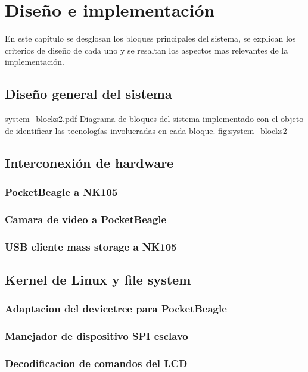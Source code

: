 \chapter{Diseño e implementación} %

\label{Chapter3}

En este capítulo se desglosan los bloques principales del sistema, se explican los criterios de diseño de cada uno y se resaltan los aspectos mas relevantes de la implementación.

\section{Diseño general del sistema}
         {system_blocks2.pdf}
         {Diagrama de bloques del sistema implementado con el objeto de identificar las tecnologías involucradas en cada bloque.}
         {fig:system_blocks2}
   
\section{Interconexión de hardware}
   \subsection{PocketBeagle a NK105}
   \subsection{Camara de video a PocketBeagle}
   \subsection{USB cliente mass storage a NK105}
\section{Kernel de Linux y file system}
   \subsection{Adaptacion del devicetree para PocketBeagle}
   \subsection{Manejador de dispositivo SPI esclavo}
   \subsection{Decodificacion de comandos del LCD}
